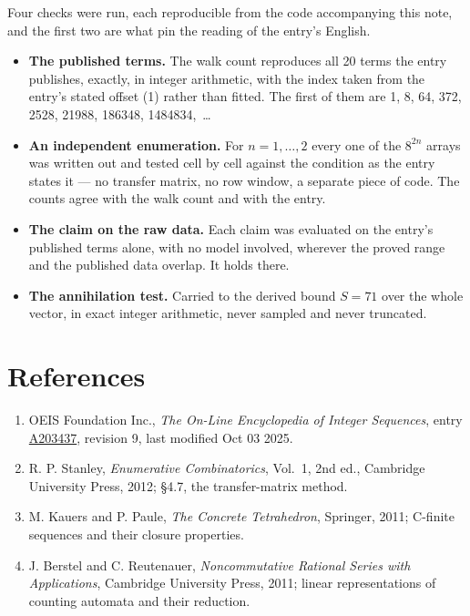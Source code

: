 \documentclass[11pt]{article}
\theoremstyle{definition}
\begin{document}
Four checks were run, each reproducible from the code accompanying this note, and the first two are what pin the reading of the entry's English.

\begin{itemize}

\item {\bfseries The published terms.} The walk count reproduces all 20 terms the entry publishes, exactly, in integer arithmetic, with the index taken from the entry's stated offset (1) rather than fitted. The first of them are 1, 8, 64, 372, 2528, 21988, 186348, 1484834,~\dots

\item {\bfseries An independent enumeration.} For $n = 1,\dots,2$ every one of the $8^{2n}$ arrays was written out and tested cell by cell against the condition as the entry states it --- no transfer matrix, no row window, a separate piece of code. The counts agree with the walk count and with the entry.

\item {\bfseries The claim on the raw data.} Each claim was evaluated on the entry's published terms alone, with no model involved, wherever the proved range and the published data overlap. It holds there.

\item {\bfseries The annihilation test.} Carried to the derived bound $S = 71$ over the whole vector, in exact integer arithmetic, never sampled and never truncated.

\end{itemize}

\section{References}

\begin{enumerate}

\item OEIS Foundation Inc., \emph{The On-Line Encyclopedia of Integer Sequences}, entry \href{https://oeis.org/A203437}{A203437}, revision 9, last modified Oct 03 2025.

\item R. P. Stanley, \emph{Enumerative Combinatorics}, Vol.~1, 2nd ed., Cambridge University Press, 2012; \S4.7, the transfer-matrix method.

\item M. Kauers and P. Paule, \emph{The Concrete Tetrahedron}, Springer, 2011; C-finite sequences and their closure properties.

\item J. Berstel and C. Reutenauer, \emph{Noncommutative Rational Series with Applications}, Cambridge University Press, 2011; linear representations of counting automata and their reduction.

\end{enumerate}
\end{document}
